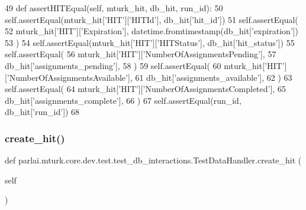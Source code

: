 \begin{DoxyCode}
49     \textcolor{keyword}{def }assertHITEqual(self, mturk\_hit, db\_hit, run\_id):
50         self.assertEqual(mturk\_hit[\textcolor{stringliteral}{'HIT'}][\textcolor{stringliteral}{'HITId'}], db\_hit[\textcolor{stringliteral}{'hit\_id'}])
51         self.assertEqual(
52             mturk\_hit[\textcolor{stringliteral}{'HIT'}][\textcolor{stringliteral}{'Expiration'}], datetime.fromtimestamp(db\_hit[\textcolor{stringliteral}{'expiration'}])
53         )
54         self.assertEqual(mturk\_hit[\textcolor{stringliteral}{'HIT'}][\textcolor{stringliteral}{'HITStatus'}], db\_hit[\textcolor{stringliteral}{'hit\_status'}])
55         self.assertEqual(
56             mturk\_hit[\textcolor{stringliteral}{'HIT'}][\textcolor{stringliteral}{'NumberOfAssignmentsPending'}],
57             db\_hit[\textcolor{stringliteral}{'assignments\_pending'}],
58         )
59         self.assertEqual(
60             mturk\_hit[\textcolor{stringliteral}{'HIT'}][\textcolor{stringliteral}{'NumberOfAssignmentsAvailable'}],
61             db\_hit[\textcolor{stringliteral}{'assignments\_available'}],
62         )
63         self.assertEqual(
64             mturk\_hit[\textcolor{stringliteral}{'HIT'}][\textcolor{stringliteral}{'NumberOfAssignmentsCompleted'}],
65             db\_hit[\textcolor{stringliteral}{'assignments\_complete'}],
66         )
67         self.assertEqual(run\_id, db\_hit[\textcolor{stringliteral}{'run\_id'}])
68 
\end{DoxyCode}
\mbox{\label{classparlai_1_1mturk_1_1core_1_1dev_1_1test_1_1test__db__interactions_1_1TestDataHandler_a9b8412813e505af83e8fa3b27baa6c6e}} 
\subsubsection{\texorpdfstring{create\+\_\+hit()}{create\_hit()}}
{\footnotesize\ttfamily def parlai.\+mturk.\+core.\+dev.\+test.\+test\+\_\+db\+\_\+interactions.\+Test\+Data\+Handler.\+create\+\_\+hit (\begin{DoxyParamCaption}\item[{}]{self }\end{DoxyParamCaption})}



